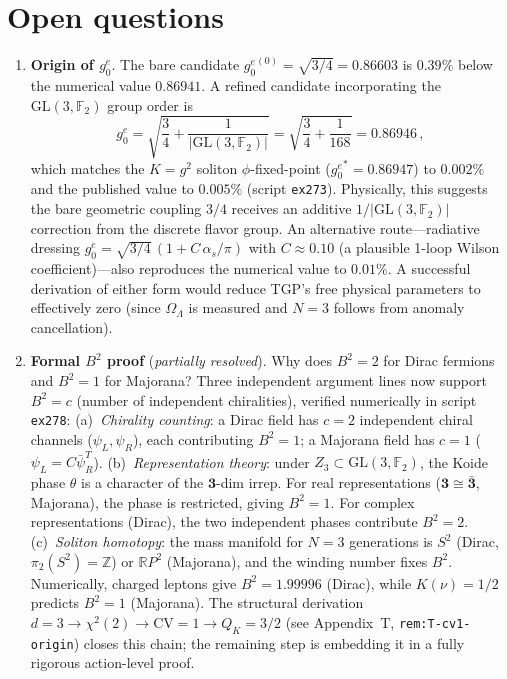 \documentclass[aps,prd,twocolumn,superscriptaddress,showpacs,
  nofootinbib,floatfix,longbibliography]{revtex4-2}
\newcommand{\gone}{{g_0^e}}
\newcommand{\OL}{\Omega_\Lambda}
\newcommand{\GL}{\mathrm{GL}(3,\mathbb{F}_2)}
\newcommand{\as}{\alpha_s}
\begin{document}
\section{Open questions}\label{sec:open}

\begin{enumerate}
\item \textbf{Origin of $\gone$}.
  The bare candidate $\gone^{(0)} = \sqrt{3/4} = 0.86603$ is $0.39\%$
  below the numerical value $0.86941$.
  A refined candidate incorporating the $\GL$ group order is
  \begin{equation}\label{eq:g0-candidate}
    \gone = \sqrt{\frac{3}{4} + \frac{1}{|\GL|}}
          = \sqrt{\frac{3}{4} + \frac{1}{168}}
          = 0.86946\,,
  \end{equation}
  which matches the $K = g^2$ soliton $\phi$-fixed-point
  ($\gone^* = 0.86947$) to $0.002\%$ and the published value to
  $0.005\%$ (script \texttt{ex273}).
  Physically, this suggests the bare geometric coupling $3/4$
  receives an additive $1/|\GL|$ correction from the discrete
  flavor group.
  An alternative route---radiative dressing
  $\gone = \sqrt{3/4}\,(1 + C\,\as/\pi)$ with $C \approx 0.10$
  (a plausible 1-loop Wilson coefficient)---also reproduces the
  numerical value to $0.01\%$.
  A successful derivation of either form would reduce TGP's free
  physical parameters to effectively zero (since $\OL$ is measured
  and $N = 3$ follows from anomaly cancellation).

\item \textbf{Formal $B^2$ proof} (\emph{partially resolved}).
  Why does $B^2 = 2$ for Dirac fermions and $B^2 = 1$ for Majorana?
  Three independent argument lines now support $B^2 = c$ (number of
  independent chiralities), verified numerically in script
  \texttt{ex278}:
  (a)~\emph{Chirality counting}: a Dirac field has $c = 2$ independent
  chiral channels ($\psi_L, \psi_R$), each contributing $B^2 = 1$;
  a Majorana field has $c = 1$ ($\psi_L = C\bar\psi_R^T$).
  (b)~\emph{Representation theory}: under $Z_3 \subset \GL$, the
  Koide phase $\theta$ is a character of the $\mathbf{3}$-dim irrep.
  For real representations ($\mathbf{3} \cong \mathbf{\bar 3}$,
  Majorana), the phase is restricted, giving $B^2 = 1$.
  For complex representations (Dirac), the two independent phases
  contribute $B^2 = 2$.
  (c)~\emph{Soliton homotopy}: the mass manifold for $N = 3$
  generations is $S^2$ (Dirac, $\pi_2(S^2) = \mathbb{Z}$) or
  $\mathbb{R}P^2$ (Majorana), and the winding number fixes $B^2$.
  Numerically, charged leptons give $B^2 = 1.99996$ (Dirac),
  while $K(\nu) = 1/2$ predicts $B^2 = 1$ (Majorana).
  The structural derivation $d{=}3 \to \chi^2(2) \to \mathrm{CV}=1 \to Q_K=3/2$
  (see Appendix~T, \texttt{rem:T-cv1-origin}) closes this chain;
  the remaining step is embedding it in a fully rigorous action-level proof.


\end{enumerate}
\end{document}
